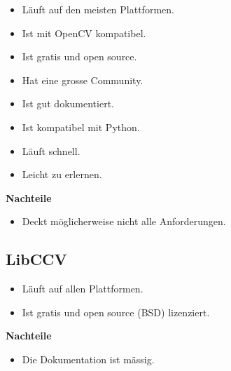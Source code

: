 \begin{itemize}
\item Läuft auf den meisten Plattformen.
\item Ist mit OpenCV kompatibel.
\item Ist gratis und open source.
\item Hat eine grosse Community.
\item Ist gut dokumentiert.
\item Ist kompatibel mit Python.
\item Läuft schnell.
\item Leicht zu erlernen.
\end{itemize}
\textbf {Nachteile}
\begin{itemize}
\item Deckt möglicherweise nicht alle Anforderungen.	
\end{itemize}

\subsection {LibCCV}
\begin{itemize}
\item Läuft auf allen Plattformen.
\item Ist gratis und open source (BSD) lizenziert.
\end{itemize}
\textbf {Nachteile}
\begin{itemize}
\item Die Dokumentation ist mässig.
\end{itemize}




